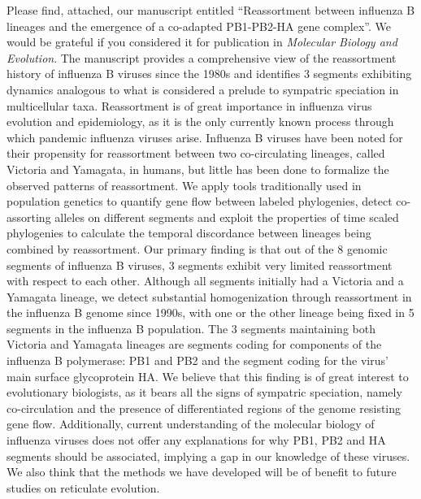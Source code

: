 \documentclass[stdletter,letterpaper,addrfromright,orderfromdateto,dateleft,11pt,noaddrto,sigleft]{newlfm}
\begin{document}
\begin{newlfm}
Please find, attached, our manuscript entitled ``Reassortment between influenza B lineages and the emergence of a co-adapted PB1-PB2-HA gene complex''.
We would be grateful if you considered it for publication in \textit{Molecular Biology and Evolution}.
The manuscript provides a comprehensive view of the reassortment history of influenza B viruses since the 1980s and identifies 3 segments exhibiting dynamics analogous to what is considered a prelude to sympatric speciation in multicellular taxa.
Reassortment is of great importance in influenza virus evolution and epidemiology, as it is the only currently known process through which pandemic influenza viruses arise.
Influenza B viruses have been noted for their propensity for reassortment between two co-circulating lineages, called Victoria and Yamagata, in humans, but little has been done to formalize the observed patterns of reassortment.
We apply tools traditionally used in population genetics to quantify gene flow between labeled phylogenies, detect co-assorting alleles on different segments and exploit the properties of time scaled phylogenies to calculate the temporal discordance between lineages being combined by reassortment.
Our primary finding is that out of the 8 genomic segments of influenza B viruses, 3 segments exhibit very limited reassortment with respect to each other.
Although all segments initially had a Victoria and a Yamagata lineage, we detect substantial homogenization through reassortment in the influenza B genome since 1990s, with one or the other lineage being fixed in 5 segments in the influenza B population.
The 3 segments maintaining both Victoria and Yamagata lineages are segments coding for components of the influenza B polymerase: PB1 and PB2 and the segment coding for the virus' main surface glycoprotein HA.
We believe that this finding is of great interest to evolutionary biologists, as it bears all the signs of sympatric speciation, namely co-circulation and the presence of differentiated regions of the genome resisting gene flow.
Additionally, current understanding of the molecular biology of influenza viruses does not offer any explanations for why PB1, PB2 and HA segments should be associated, implying a gap in our knowledge of these viruses.
We also think that the methods we have developed will be of benefit to future studies on reticulate evolution.

\end{newlfm}
\end{document}
